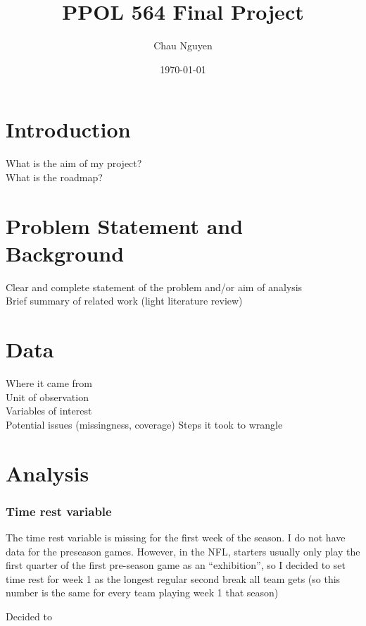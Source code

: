 \documentclass[12pt, letterpaper, twoside]{article}
\begin{document}
\title{PPOL 564 Final Project}
\author{Chau Nguyen}
\date{\today}
\maketitle


\section{Introduction}

What is the aim of my project? \\
What is the roadmap?

\section{Problem Statement and Background}

Clear and complete statement of the problem and/or aim of analysis \\
Brief summary of related work (light literature review)

\section{Data}
Where it came from \\
Unit of observation \\
Variables of interest \\ 
Potential issues (missingness, coverage)
Steps it took to wrangle \\

\section{Analysis}

\subsubsection{Time rest variable}
The time rest variable is missing for the first week of the season. I do not have data for the preseason games. However, in the NFL, starters usually only play the first quarter of the first pre-season game as an ``exhibition'', so I decided to set time rest for week 1 as the longest regular second break all team gets (so this number is the same for every team playing week 1 that season)

Decided to 
\end{document}
